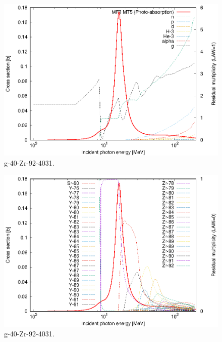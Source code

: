 \begin{figure}
 \includegraphics[width=\linewidth]{eps/g_40-Zr-92_4031.eps}
  \caption{g-40-Zr-92-4031.}
\end{figure}
\begin{figure}
 \includegraphics[width=\linewidth]{eps-law0/g_40-Zr-92_4031.eps}
 \caption{g-40-Zr-92-4031.}
\end{figure}
\newpage \clearpage

